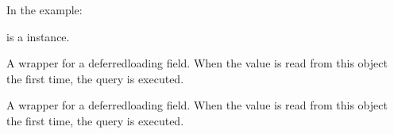 \documentclass[a4paper,11pt,spanish]{sphinxmanual}
\begin{document}
\begin{fulllineitems}
\begin{fulllineitems}
\sphinxAtStartPar
In the example:

\begin{sphinxVerbatim}[commandchars=\\\{\}]
       
\end{sphinxVerbatim}

\sphinxAtStartPar
{} is a  instance.

\end{fulllineitems}


\begin{fulllineitems}
\label{\detokenize{api/inventory/inventory.models:inventory.models.Inventory.product_id}}
\pysigstartsignatures
\pysigline
{}
\pysigstopsignatures
\end{fulllineitems}


\begin{fulllineitems}
\label{\detokenize{api/inventory/inventory.models:inventory.models.Inventory.quantity}}
\pysigstartsignatures
\pysigline
{}
\pysigstopsignatures
\sphinxAtStartPar
A wrapper for a deferred\sphinxhyphen{}loading field. When the value is read from this
object the first time, the query is executed.

\end{fulllineitems}


\begin{fulllineitems}
\label{\detokenize{api/inventory/inventory.models:inventory.models.Inventory.updated_at}}
\pysigstartsignatures
\pysigline
{}
\pysigstopsignatures
\sphinxAtStartPar
A wrapper for a deferred\sphinxhyphen{}loading field. When the value is read from this
object the first time, the query is executed.

\end{fulllineitems}


\end{fulllineitems}
\end{document}
